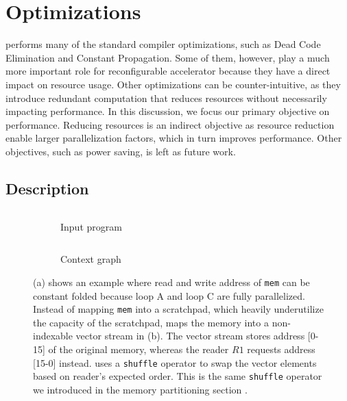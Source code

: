 \section{Optimizations}\label{sec:opt}
\name performs many of the standard compiler optimizations,
such as Dead Code Elimination and Constant Propagation.
Some of them, however, play a much more important role for reconfigurable accelerator because they
have a direct impact on resource usage.
Other optimizations can be counter-intuitive, as they introduce redundant computation that
reduces resources without necessarily impacting performance.
In this discussion, we focus our primary objective on performance.
Reducing resources is an indirect objective as resource reduction enable larger parallelization factors,
which in turn improves performance.
Other objectives, such as power saving, is left as future work.

\subsection{Description}\label{sec:des}

\begin{figure}
\centering
\begin{subfigure}[b]{0.4\textwidth}
\inputminted{python}{code/msr.py}
\caption{Input program}
\end{subfigure}
\hfill
\begin{subfigure}[b]{0.5\textwidth}
\inputminted{python}{code/msrctx.py}
\caption{Context graph}
\end{subfigure}
\caption[Memory strength reduction]{
  (a) shows an example where read and write address of \texttt{mem} can be constant folded because
  loop A and loop C are fully parallelized.
  Instead of mapping \texttt{mem} into a scratchpad, which heavily underutilize the capacity of the 
  scratchpad, \name maps the memory into a non-indexable vector stream in (b). The vector stream
  stores address [0-15] of the original memory, whereas the reader $R1$ requests address [15-0] instead.
  \name uses a \texttt{shuffle} operator to swap the vector elements based on reader's expected order.
  This is the same \texttt{shuffle} operator we introduced in the memory partitioning section
  . 
}
\label{fig:msr}
\end{figure}

